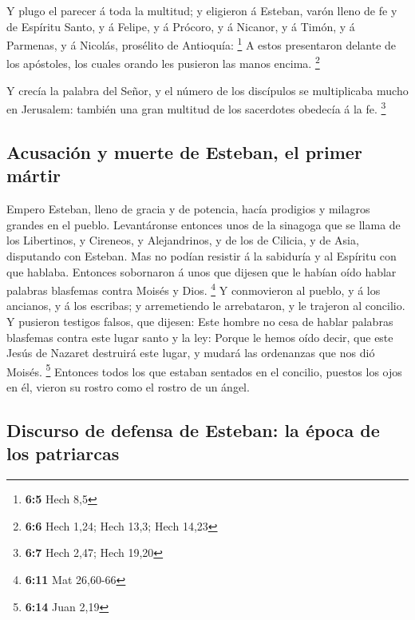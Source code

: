  Y plugo el parecer á toda la multitud; y eligieron á
Esteban, varón lleno de fe y de Espíritu Santo, y á Felipe, y á Prócoro,
y á Nicanor, y á Timón, y á Parmenas, y á Nicolás, prosélito de
Antioquía: \footnote{\textbf{6:5} Hech 8,5}  A estos
presentaron delante de los apóstoles, los cuales orando les pusieron las
manos encima. \footnote{\textbf{6:6} Hech 1,24; Hech 13,3; Hech 14,23}

 Y crecía la palabra del Señor, y el número de los
discípulos se multiplicaba mucho en Jerusalem: también una gran multitud
de los sacerdotes obedecía á la fe. \footnote{\textbf{6:7} Hech 2,47;
  Hech 19,20}

\hypertarget{acusaciuxf3n-y-muerte-de-esteban-el-primer-muxe1rtir}{%
\subsection{Acusación y muerte de Esteban, el primer
mártir}\label{acusaciuxf3n-y-muerte-de-esteban-el-primer-muxe1rtir}}

 Empero Esteban, lleno de gracia y de potencia, hacía
prodigios y milagros grandes en el pueblo.  Levantáronse
entonces unos de la sinagoga que se llama de los Libertinos, y Cireneos,
y Alejandrinos, y de los de Cilicia, y de Asia, disputando con Esteban.
 Mas no podían resistir á la sabiduría y al Espíritu con
que hablaba.  Entonces sobornaron á unos que dijesen que
le habían oído hablar palabras blasfemas contra Moisés y Dios.
\footnote{\textbf{6:11} Mat 26,60-66}  Y conmovieron al
pueblo, y á los ancianos, y á los escribas; y arremetiendo le
arrebataron, y le trajeron al concilio.  Y pusieron
testigos falsos, que dijesen: Este hombre no cesa de hablar palabras
blasfemas contra este lugar santo y la ley:  Porque le
hemos oído decir, que este Jesús de Nazaret destruirá este lugar, y
mudará las ordenanzas que nos dió Moisés. \footnote{\textbf{6:14} Juan
  2,19}  Entonces todos los que estaban sentados en el
concilio, puestos los ojos en él, vieron su rostro como el rostro de un
ángel.

\hypertarget{discurso-de-defensa-de-esteban-la-uxe9poca-de-los-patriarcas}{%
\subsection{Discurso de defensa de Esteban: la época de los
patriarcas}\label{discurso-de-defensa-de-esteban-la-uxe9poca-de-los-patriarcas}}

